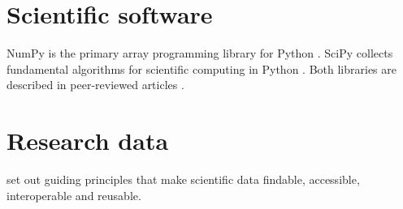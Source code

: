 \documentclass{article}
\begin{document}
\section{Scientific software}

NumPy is the primary array programming library for Python \parencite{harris2020array}.
SciPy collects fundamental algorithms for scientific computing in Python
\parencite[see][]{virtanen2020scipy}.
Both libraries are described in peer-reviewed articles
\parencites{harris2020array}{virtanen2020scipy}.

\section{Research data}

\textcite{wilkinson2016fair} set out guiding principles that make scientific data
findable, accessible, interoperable and reusable.

\printbibliography
\end{document}
